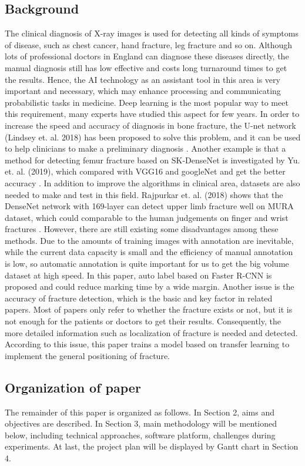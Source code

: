 \documentclass[12pt,oneside,a4paper]{article}
\begin{document}
\subsection{Background}
The clinical diagnosis of X-ray images is used for detecting all kinds of symptoms of disease, such as chest cancer, hand fracture, leg fracture and so on.  Although lots of professional doctors in England can diagnose these diseases directly, the manual diagnosis still has low effective and costs long turnaround times to get the results.  Hence, the AI technology as an assistant tool in this area is very important and necessary, which may enhance processing and communicating probabilistic tasks in medicine. Deep learning is the most popular way to meet this requirement, many experts have studied this aspect for few years. In order to increase the speed and accuracy of diagnosis in bone fracture, the U-net network (Lindsey et. al. 2018) has been proposed to solve this problem, and it can be used to help clinicians to make a preliminary diagnosis \cite{b1}. Another example is that a method for detecting femur fracture based on SK-DenseNet is investigated by Yu. et. al. (2019), which compared with VGG16 and googleNet and get the better accuracy \cite{b2}. In addition to improve the algorithms in clinical area, datasets are also needed to make and test in this field. Rajpurkar et. al. (2018) shows that the DenseNet network with 169-layer can detect upper limb fracture well on MURA dataset, which could comparable to the human judgements on finger and wrist fractures \cite{b3}. However, there are still existing some disadvantages among these methods. Due to the amounts of training images with annotation are inevitable, while the current data capacity is small and the efficiency of manual annotation is low, so automatic annotation is quite important for us to get the big volume dataset at high speed. In this paper, auto label based on Faster R-CNN \cite{b4} is proposed and could reduce marking time by a wide margin. Another issue is the accuracy of fracture detection, which is the basic and key factor in related papers. Most of papers only refer to whether the fracture exists or not, but it is not enough for the patients or doctors to get their results. Consequently, the more detailed information such as localization of fracture is needed and detected. According to this issue, this paper trains a model based on transfer learning to implement the general positioning of fracture.

\subsection{Organization of paper}
The remainder of this paper is organized as follows. In Section 2, aims and objectives are described. In Section 3, main methodology will be mentioned below, including technical approaches, software platform, challenges during experiments. At last, the project plan will be displayed by Gantt chart in Section 4.
\end{document}
